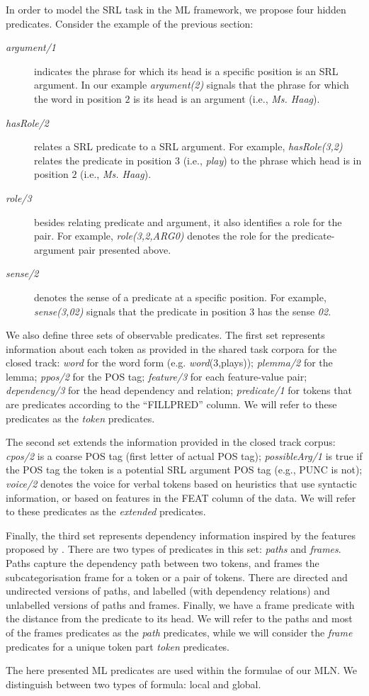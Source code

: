 
In order to model the SRL task in the ML framework, we propose four hidden 
predicates. Consider the example of the previous section:
\begin{description}
    \item [\emph{argument/1}] indicates the phrase for which its head is a 
        specific position is an SRL argument. In our example     
        \emph{argument(2)} signals that the phrase for which the word in 
        position $2$ is its head is an argument (i.e., \emph{Ms. Haag}).
    \item [\emph{hasRole/2}] relates a SRL predicate to a SRL argument. For example, \emph{hasRole(3,2)} relates the
        predicate in position $3$ (i.e., \emph{play}) to the phrase which head 
        is in position $2$ (i.e., \emph{Ms. Haag}).
    \item [\emph{role/3}] besides relating predicate and argument, it also
        identifies a role for the pair. For example,
        \emph{role(3,2,ARG0)} denotes the role for the predicate-argument pair 
        presented above.
    \item [\emph{sense/2}] denotes the sense of a predicate at a
        specific position. For example, \emph{sense(3,02)}
        signals that the predicate in position $3$ has the sense \emph{02}.
\end{description}

We also define three sets of observable predicates. The first set represents information about each token as provided in the shared task corpora for the closed track:  \emph{word} for the word form (e.g. \emph{word}(3,plays)); \emph{plemma/2} for the 
lemma; \emph{ppos/2} for the POS tag; \emph{feature/3} for each feature-value 
pair; \emph{dependency/3} for the head dependency and relation; 
\emph{predicate/1} for tokens that are predicates according to the ``FILLPRED'' column. We will refer to these 
predicates as the \emph{token} predicates. 

The second set extends the information provided in the closed track corpus: 
\emph{cpos/2} is a coarse POS tag (first letter of actual POS tag); \emph{possibleArg/1} is true if the POS tag the token is a potential SRL argument  POS tag (e.g., PUNC is not); \emph{voice/2} denotes the voice for verbal tokens based on heuristics that use
syntactic information, or based on features in the FEAT column of the data. We will 
refer to these predicates as the \emph{extended} predicates.

Finally, the third set represents dependency information inspired by the features proposed by \citet{xue04calibrating}. There are two types of 
predicates in this set: \emph{paths} and \emph{frames}.  Paths capture the 
dependency path between two tokens, and frames the subcategorisation frame for a 
token or a pair of tokens. There are directed and 
undirected versions of paths, and labelled  (with dependency relations) and unlabelled versions of paths and frames. Finally, we have a frame predicate with the distance from the 
predicate to its head.  We will refer to the paths and most of the frames 
predicates as the \emph{path} predicates, while we will consider the 
\emph{frame} predicates for a unique token part \emph{token} predicates.

The here presented ML predicates are used within the formulae of our MLN.  We 
distinguish between two types of formula: local and global. 
